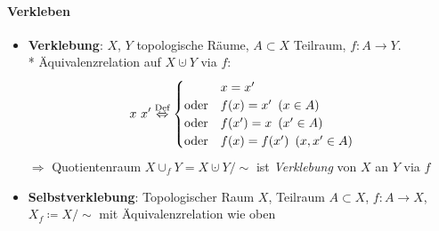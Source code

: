 \paragraph{Verkleben}
\begin{itemize}
  \item \textbf{Verklebung}: \( X \), \( Y \) topologische Räume, \( A \subset X \) Teilraum, \( f: A \to Y \). \\* Äquivalenzrelation auf \( X \cupdot Y \) via \( f \):
  \begin{equation*}
    x ~ x' \overset{\text{Def}}{\Leftrightarrow} \begin{cases}
      & x = x' \\
      \text{oder} &f(x) = x' \enskip (x \in A) \\
      \text{oder} &f(x') = x \enskip (x' \in A) \\
      \text{oder} &f(x) = f(x') \enskip (x,x' \in A)
    \end{cases}
  \end{equation*}
  \( \Rightarrow \) Quotientenraum \( X \cup_f Y = X \cupdot Y /\sim \) ist \emph{Verklebung} von \( X \) an \( Y \) via \( f \)
  \item \textbf{Selbstverklebung}: Topologischer Raum \( X \), Teilraum \( A \subset X \), \( f: A \to X \), \( X_f \coloneqq X/\sim \) mit Äquivalenzrelation wie oben
\end{itemize}